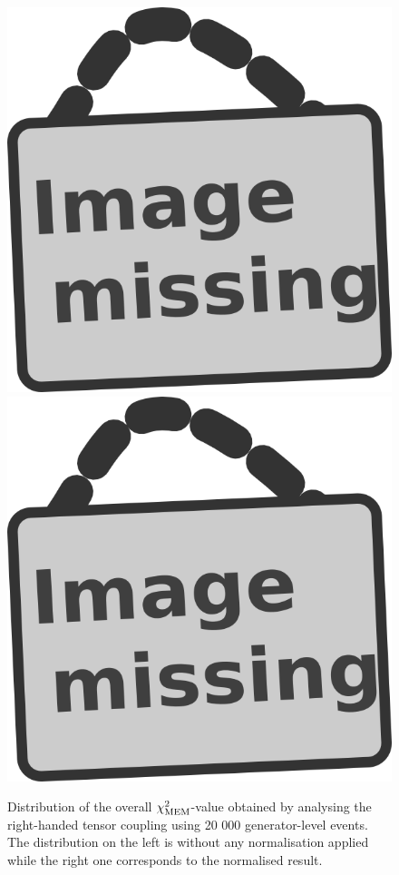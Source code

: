 \begin{figure}[h!t]
 \centering
 \includegraphics[width = 0.3 \textwidth]{image.png} \hspace{0.5cm}
 \includegraphics[width = 0.3 \textwidth]{image.png}
 \caption{Distribution of the overall $\chi^{2}_{\textrm{MEM}}$-value obtained by analysing the right-handed tensor coupling using 20 000 generator-level events. The distribution on the left is without any normalisation applied while the right one corresponds to the normalised result.} \label{fig::XSInflGen}
\end{figure}

